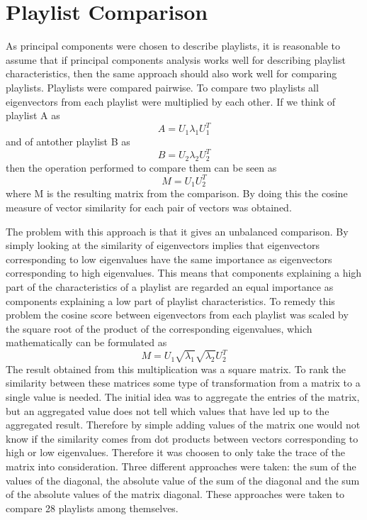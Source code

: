 \documentclass[a4paper,11pt]{kth-mag}
\begin{document}
\section{Playlist Comparison}
As principal components were chosen to describe playlists, it is reasonable to assume that if principal components analysis works well for describing playlist characteristics, then the same approach should also work well for comparing playlists. Playlists were compared pairwise. To compare two playlists all eigenvectors from each playlist were multiplied by each other. If we think of playlist A as  \[A = U_1 \lambda_1 U_1^T\] and of antother playlist B as \[B = U_2 \lambda_2 U_2^T\] then the operation performed to compare them can be seen as \[M = U_1 U_2^T\] where M is the resulting matrix from the comparison. By doing this the cosine measure of vector similarity for each pair of vectors was obtained. 

The problem with this approach is that it gives an unbalanced comparison. By simply looking at the similarity of eigenvectors implies that eigenvectors corresponding to low eigenvalues have the same importance as eigenvectors corresponding to high eigenvalues. This means that components explaining a high part of the characteristics of a playlist are regarded an equal importance as components explaining a low part of playlist characteristics. To remedy this problem the cosine score between eigenvectors from each playlist was scaled by the square root of the product of the corresponding eigenvalues, which mathematically can be formulated as  \[M = U_1 \sqrt{\lambda_1} \sqrt{\lambda_2} U_2^T \] The result obtained from this multiplication was a square matrix. To rank the similarity between these matrices some type of transformation from a matrix to a single value is needed. The initial idea was to aggregate the entries of the matrix, but an aggregated value does not tell which values that have led up to the aggregated result. Therefore by simple adding values of the matrix one would not know if the similarity comes from dot products between vectors corresponding to high or low eigenvalues. Therefore it was choosen to only take the trace of the matrix into consideration. Three different approaches were taken: the sum of the values of the diagonal, the absolute value of the sum of the diagonal and the sum of the absolute values of the matrix diagonal. These approaches were taken to compare 28 playlists among themselves.
\end{document}
